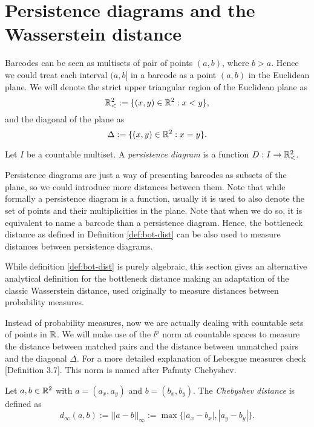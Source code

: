 \section{Persistence diagrams and the Wasserstein distance} \label{sec:preliminaries-wp-persistance}
Barcodes can be seen as multisets of pair of points $ (a, b) $, where $ b > a $. Hence we could treat each interval $ (a, b] $ in a barcode as a point $ (a, b) $ in the Euclidean plane. We will denote the strict upper triangular region of the Euclidean plane as
\begin{equation}
   \mathbb{R}_<^2 := \{(x, y) \in \mathbb R^2 : x < y\}, 
\end{equation}
and the diagonal of the plane as
\begin{equation}
    \Delta := \{(x, y) \in \mathbb R^2 : x = y\}.
\end{equation}

\begin{definition}
    Let $ I $ be a countable multiset. A {\it persistence diagram} is a function $ D: I \to \mathbb{R}_<^2 $.
\end{definition}

Persistence diagrams are just a way of presenting barcodes as subsets of the plane, so we could introduce more distances between them. Note that while formally a persistence diagram is a function, usually it is used to also denote the set of points and their multiplicities in the plane. Note that when we do so, it is equivalent to name a barcode than a persistence diagram. Hence, the bottleneck distance as defined in Definition \ref{def:bot-dist} can be also used to measure distances between persistence diagrams.

While definition \ref{def:bot-dist} is purely algebraic, this section gives an alternative analytical definition for the bottleneck distance making an adaptation of the classic Wasserstein distance, used originally to measure distances between probability measures.

Instead of probability measures, now we are actually dealing with countable sets of points in $ \mathbb R $. We will make use of the $ l^p $ norm at countable spaces to measure the distance between matched pairs and the distance between unmatched pairs and the diagonal $ \Delta $. For a more detailed explanation of Lebesgue measures check \cite{rudin}[Definition 3.7]. This norm is named after Pafnuty Chebyshev.

\begin{definition}
    Let $ a, b \in \mathbb R^2 $ with $a = (a_x, a_y) $ and $ b = (b_x, b_y) $. The {\it Chebyshev distance} is defined as
    \begin{equation}
        d_\infty(a, b) := ||a-b||_{\infty} := \max \{|a_x - b_x|, |a_y - b_y|\}.
    \end{equation}
\end{definition}

